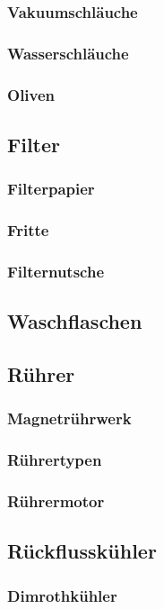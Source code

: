 \subsubsection{Vakuumschläuche}
\subsubsection{Wasserschläuche}
\subsubsection{Oliven}

\subsection{Filter}
\subsubsection{Filterpapier}
\subsubsection{Fritte}
\subsubsection{Filternutsche}

\subsection{Waschflaschen}

\subsection{Rührer}
\subsubsection{Magnetrührwerk}
\subsubsection{Rührertypen}
\subsubsection{Rührermotor}

\subsection{Rückflusskühler}
\subsubsection{Dimrothkühler}
